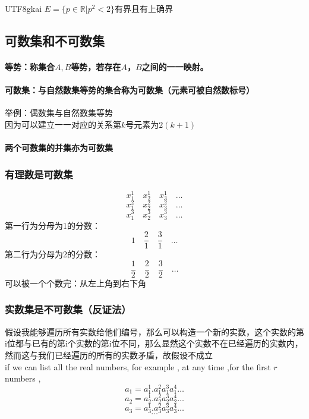\documentclass{article}
\begin{document}
\begin{CJK}{UTF8}{gkai}
$E=\{p\in \mathbb{R}  |p^2<2\}$有界且有上确界\\
\subsection{可数集和不可数集}
\paragraph{等势：称集合$A,B$等势，若存在$A$，$B$之间的一一映射。\\}
\paragraph{可数集：与自然数集等势的集合称为可数集（元素可被自然数标号）\\}
举例：偶数集与自然数集等势\\
因为可以建立一一对应的关系第$k$号元素为$2(k+1)$\\
\paragraph{两个可数集的并集亦为可数集\\}
\subsubsection{有理数是可数集}
\[x_1^1 \quad  x_2^1 \quad  x_3^1 \quad  \dots\]
\[x_1^2 \quad  x_2^2 \quad  x_3^2 \quad  \dots\]
\[x_1^3 \quad  x_2^3 \quad  x_3^3 \quad  \dots\]
第一行为分母为1的分数：$$1 \quad \frac{2}{1} \quad \frac{3}{1} \quad \dots$$ \newline
第二行为分母为2的分数：$$\frac{1}{2} \quad \frac{2}{2} \quad \frac{3}{2} \quad \dots$$ \newline
可以被一个个数完：从左上角到右下角\\
\subsubsection{实数集是不可数集（反证法）}
假设我能够遍历所有实数给他们编号，那么可以构造一个新的实数，这个实数的第i位都与已有的第i个实数的第i位不同，那么显然这个实数不在已经遍历的实数内，然而这与我们已经遍历的所有的实数矛盾，故假设不成立\\
if we can list all the real numbers,
for example , at any time ,for the first $r$ numbers ,
\[a_1=a_1^1.a_1^2  a_1^3  a_1^4  \dots\]
\[a_2=a_2^1.a_2^2  a_2^3  a_2^4  \dots\]
\[a_3=a_3^1.a_3^2  a_3^3  a_3^4  \dots\]
\[\dots\]


\end{CJK}
\end{document}
